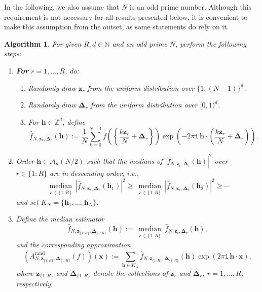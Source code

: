 \documentclass[a4paper,11pt]{article}
\newtheorem{algorithm}[theorem]{Algorithm}
\newcommand{\rand}{\mathrm{rand}}
\newcommand{\bsh}{\boldsymbol{h}}
\newcommand{\bsx}{\boldsymbol{x}}
\newcommand{\bsz}{\boldsymbol{z}}
\newcommand{\bsDelta}{\boldsymbol{\Delta}}
\newcommand{\NN}{\mathbb{N}}
\newcommand{\ZZ}{\mathbb{Z}}
\newcommand{\Acal}{\mathcal{A}}
\newcommand{\icomp}{\mathtt{i}}
\begin{document}
In the following, we also assume that $N$ is an odd prime number. Although this requirement is not necessary for all results presented below, it is convenient to make this assumption from the outset, as some statements do rely on it.

\begin{algorithm}\label{alg:median}
    For given $R, d \in \NN$ and an odd prime $N$, perform the following steps:
    \begin{enumerate}
        \item \textbf{For} $r = 1, \dots, R$, do:
        \begin{enumerate}
            \item Randomly draw $\bsz_{r}$ from the uniform distribution over $\{1{:}(N-1)\}^d$.
            \item Randomly draw $\bsDelta_r$ from the uniform distribution over $[0,1)^d$.
            \item For $\bsh\in\ZZ^d$, define
        \[
        \widehat{f}_{N,\bsz_r,\bsDelta_r}(\bsh) :=
        \frac{1}{N} \sum_{k=0}^{N-1} 
        f\left( \left\{ \frac{k \bsz_r}{N}+\bsDelta_r \right\} \right)
        \exp\left(-2\pi \icomp \, \bsh \cdot \left( \frac{k \bsz_r}{N}+\bsDelta_r\right) \right).
        \]
        \end{enumerate}
        \item Order $\bsh \in \Acal_{d}(N/2)$ such that the medians of 
    $|\widehat{f}_{N,\bsz_r,\bsDelta_r}(\bsh)|^2$ over $r\in \{1{:}R\}$ 
    are in descending order, i.e.,
    \[
      \operatorname*{median}_{\substack{r\in\{1{:}R\}}} 
      |\widehat{f}_{N,\bsz_r,\bsDelta_r}(\bsh_1)|^2
      \ge 
      \operatorname*{median}_{\substack{r\in\{1{:}R\}}} 
      |\widehat{f}_{N,\bsz_r,\bsDelta_r}(\bsh_2)|^2
      \ge \cdots
    \]
    and set $K_N = \{\bsh_1, \dots, \bsh_N\}$.
    
       \item Define the median estimator
    \[
      \widehat{f}_{N,\bsz_{\{1{:}R\}},\bsDelta_{\{1{:}R\}}}(\bsh) :=
      \operatorname*{median}_{\substack{r\in\{1{:}R\}}} 
      \widehat{f}_{N,\bsz_r,\bsDelta_r}(\bsh),
    \]
    and the corresponding approximation
    \[
      (A^{\rand}_{N,\bsz_{\{1{:}R\}},\bsDelta_{\{1{:}R\}}}(f))(\bsx)
      := \sum_{\bsh \in K_N} 
      \widehat{f}_{N,\bsz_{\{1{:}R\}},\bsDelta_{\{1{:}R\}}}(\bsh)
      \exp (2 \pi \icomp \, \bsh \cdot \bsx),
    \]
    where $\bsz_{\{1{:}R\}}$ and $\bsDelta_{\{1{:}R\}}$ denote the collections 
    of $\bsz_r$ and $\bsDelta_r$, $r = 1, \dots, R$, respectively.
\end{enumerate}
\end{algorithm}
\end{document}
